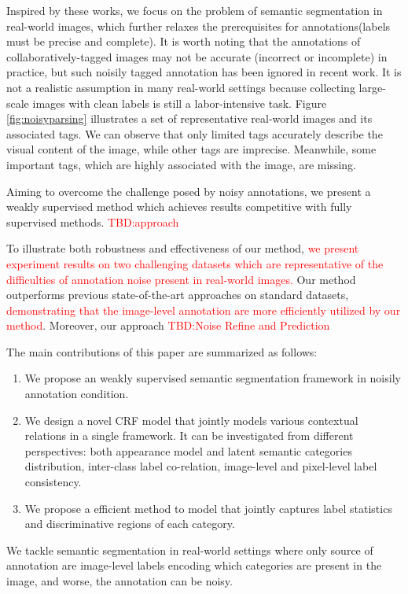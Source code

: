 Inspired by these works, we focus on the problem of semantic segmentation in real-world images, which further relaxes the prerequisites for annotations(\eg labels must be precise and complete). It is worth noting that the annotations of collaboratively-tagged images may not be accurate (incorrect or incomplete) in practice, but such noisily tagged annotation has been ignored in recent work. It is not a realistic assumption in many real-world settings because collecting large-scale images with clean labels is still a labor-intensive task. Figure \ref{fig:noisyparsing} illustrates a set of representative real-world images and its associated tags. We can observe that only limited tags accurately describe the visual content of the image, while other tags are imprecise. Meanwhile, some important tags, which are highly associated with the image, are missing.

Aiming to overcome the challenge posed by noisy annotations, we present a weakly supervised method which achieves results competitive with fully supervised methods. {\textcolor{red}{TBD:approach}}

To illustrate both robustness and effectiveness of our method, {\textcolor{red}{we present experiment results on two challenging datasets which are representative of the difficulties of annotation noise present in real-world images.}} Our method outperforms previous state-of-the-art approaches on standard datasets, {\textcolor{red}{demonstrating that the image-level annotation are more efficiently utilized by our method}}. Moreover, our approach {\textcolor{red}{TBD:Noise Refine and Prediction}}

The main contributions of this paper are summarized as follows:
\begin{enumerate}
  \item We propose an weakly supervised semantic segmentation framework in noisily annotation condition.
  \item We design a novel CRF model that jointly models various contextual relations in a single framework. It can be investigated from different perspectives: both appearance model and latent semantic categories distribution, inter-class label co-relation, image-level and pixel-level label consistency.
  \item We propose a efficient method to model that jointly captures label statistics and discriminative regions of each category.
\end{enumerate}

\if
We tackle semantic segmentation in real-world settings where only source of annotation are image-level labels encoding which categories are present in the image, and worse, the annotation can be noisy.

